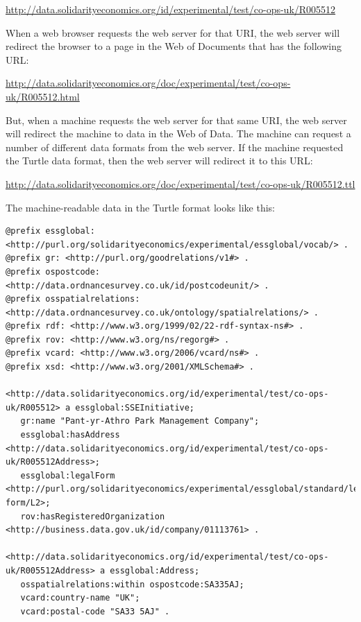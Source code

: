 {\footnotesize \url{http://data.solidarityeconomics.org/id/experimental/test/co-ops-uk/R005512} }

When a web browser requests the web server for that URI, the web server will redirect the browser to a page in the Web of Documents that has the following URL:

{\footnotesize \url{http://data.solidarityeconomics.org/doc/experimental/test/co-ops-uk/R005512.html} }

But, when a machine requests the web server for that same URI, the web server will redirect the machine to data in the Web of Data. 
The machine can request a number of different data formats from the web server.
If the machine requested the Turtle data format, then the web server will redirect it to this URL:

{\footnotesize \url{http://data.solidarityeconomics.org/doc/experimental/test/co-ops-uk/R005512.ttl} }

The machine-readable data in the Turtle format looks like this:

{\footnotesize
\begin{verbatim}
@prefix essglobal: <http://purl.org/solidarityeconomics/experimental/essglobal/vocab/> .
@prefix gr: <http://purl.org/goodrelations/v1#> .
@prefix ospostcode: <http://data.ordnancesurvey.co.uk/id/postcodeunit/> .
@prefix osspatialrelations: <http://data.ordnancesurvey.co.uk/ontology/spatialrelations/> .
@prefix rdf: <http://www.w3.org/1999/02/22-rdf-syntax-ns#> .
@prefix rov: <http://www.w3.org/ns/regorg#> .
@prefix vcard: <http://www.w3.org/2006/vcard/ns#> .
@prefix xsd: <http://www.w3.org/2001/XMLSchema#> .

<http://data.solidarityeconomics.org/id/experimental/test/co-ops-uk/R005512> a essglobal:SSEInitiative;
   gr:name "Pant-yr-Athro Park Management Company";
   essglobal:hasAddress <http://data.solidarityeconomics.org/id/experimental/test/co-ops-uk/R005512Address>;
   essglobal:legalForm <http://purl.org/solidarityeconomics/experimental/essglobal/standard/legal-form/L2>;
   rov:hasRegisteredOrganization <http://business.data.gov.uk/id/company/01113761> .

<http://data.solidarityeconomics.org/id/experimental/test/co-ops-uk/R005512Address> a essglobal:Address;
   osspatialrelations:within ospostcode:SA335AJ;
   vcard:country-name "UK";
   vcard:postal-code "SA33 5AJ" .
\end{verbatim}
}

